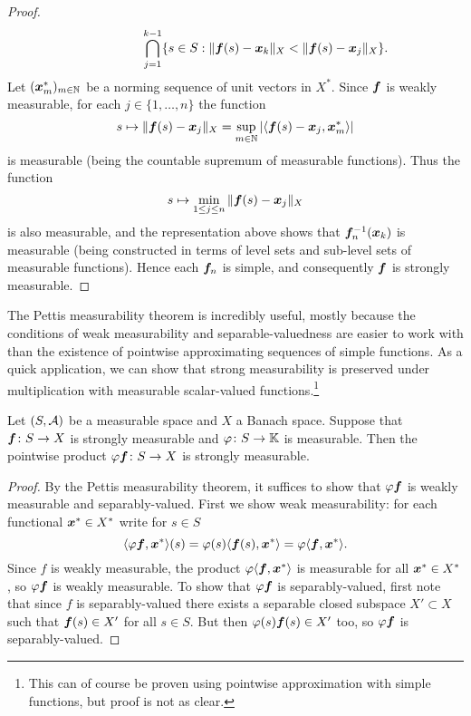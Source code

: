 \begin{proof}
\begin{equation*}
\begin{aligned}
    &\hspace{2cm} \bigcap_{j=1}^{k-1} \{s \in S : \|\bm{f}(s) - \bm{x}_{k}\|_{X} < \|\bm{f}(s) - \bm{x}_{j}\|_{X} \}.
  \end{aligned}
  \end{equation*}
  Let $(\bm{x}_m^*)_{m \in \mathbb{N}}$ be a norming sequence of unit vectors in $X^*$.
  Since $\bm{f}$ is weakly measurable, for each $j \in \{1,\ldots,n\}$ the function
  \begin{equation*}
    s \mapsto \|\bm{f}(s) - \bm{x}_j\|_X = \sup_{m \in \mathbb{N}} |\langle \bm{f}(s) - \bm{x}_j, \bm{x}_m^* \rangle|
  \end{equation*}
  is measurable (being the countable supremum of measurable functions).
  Thus the function
  \begin{equation*}
    s \mapsto \min_{1 \leq j \leq n} \|\bm{f}(s) - \bm{x}_j\|_X
  \end{equation*}
  is also measurable, and the representation above shows that $\bm{f}_n^{-1}(\bm{x}_k)$ is measurable (being constructed in terms of level sets and sub-level sets of measurable functions).
  Hence each $\bm{f}_n$ is simple, and consequently $\bm{f}$ is strongly measurable.
\end{proof}

The Pettis measurability theorem is incredibly useful, mostly because the conditions of weak measurability and separable-valuedness are easier to work with than the existence of pointwise approximating sequences of simple functions.
As a quick application, we can show that strong measurability is preserved under multiplication with measurable scalar-valued functions.\footnote{This can of course be proven using pointwise approximation with simple functions, but proof is not as clear.}

\begin{cor}\label{cor:strong-meas-meas-mult}
  Let $(S,\mathcal{A})$ be a measurable space and $X$ a Banach space.
  Suppose that $\bm{f} \colon S \rightarrow X$ is strongly measurable and $\varphi \colon S \rightarrow \mathbb{K}$ is measurable.
  Then the pointwise product $\varphi \bm{f} \colon S \rightarrow X$ is strongly measurable.
\end{cor}

\begin{proof}
  By the Pettis measurability theorem, it suffices to show that $\varphi \bm{f}$ is weakly measurable and separably-valued. 
  First we show weak measurability: for each functional $\bm{x}^* \in X^*$ write for $s \in S$
  \begin{equation*}
    \langle \varphi \bm{f}, \bm{x}^* \rangle(s) = \varphi(s) \langle \bm{f}(s) , \bm{x}^* \rangle = \varphi \langle \bm{f}, \bm{x}^* \rangle.
  \end{equation*}
  Since $f$ is weakly measurable, the product $\varphi \langle \bm{f}, \bm{x}^* \rangle$ is measurable for all $\bm{x}^* \in X^*$, so $\varphi \bm{f}$ is weakly measurable.
  To show that $\varphi \bm{f}$ is separably-valued, first note that since $f$ is separably-valued there exists a separable closed subspace $X' \subset X$ such that $\bm{f}(s) \in X'$ for all $s \in S$.
  But then $\varphi(s)\bm{f}(s) \in X'$ too, so $\varphi \bm{f}$ is separably-valued.
\end{proof}

